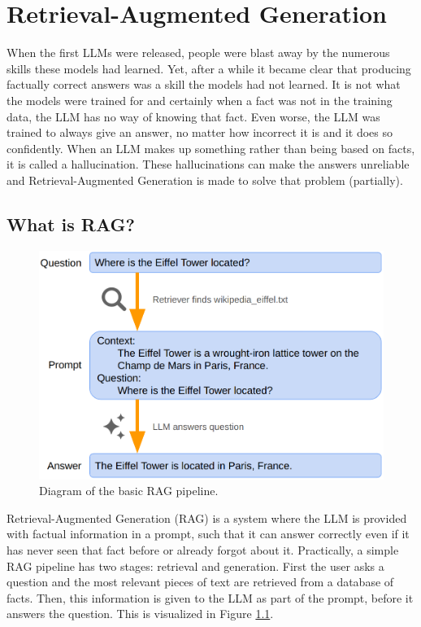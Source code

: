 
\chapter{Retrieval-Augmented Generation}
\label{sec:rag}

When the first LLMs were released, people were blast away by the numerous skills these models had learned. Yet, after a while it became clear that producing factually correct answers was a skill the models had not learned. It is not what the models were trained for and certainly when a fact was not in the training data, the LLM has no way of knowing that fact. Even worse, the LLM was trained to always give an answer, no matter how incorrect it is and it does so confidently. When an LLM makes up something rather than being based on facts, it is called a hallucination. These hallucinations can make the answers unreliable and Retrieval-Augmented Generation is made to solve that problem (partially).

\section{What is RAG?}

\begin{figure}[h]
	\centering
	\captionsetup{justification=centering}
	\includegraphics[width=0.6\linewidth]{fig/RAG.png}
	\caption{Diagram of the basic RAG pipeline.}
	\label{fig:rag}
\end{figure}

Retrieval-Augmented Generation (RAG) is a system where the LLM is provided with factual information in a prompt, such that it can answer correctly even if it has never seen that fact before or already forgot about it. Practically, a simple RAG pipeline has two stages: retrieval and generation. First the user asks a question and the most relevant pieces of text are retrieved from a database of facts. Then, this information is given to the LLM as part of the prompt, before it answers the question. This is visualized in Figure \ref{fig:rag}.

